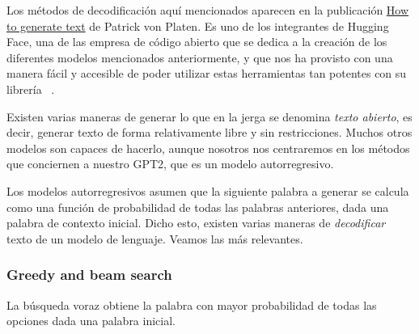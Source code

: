 Los métodos de decodificación aquí mencionados aparecen en la publicación \href{https://huggingface.co/blog/how-to-generate}{How to generate text} de Patrick von Platen. Es uno de los integrantes de Hugging Face, una de las empresa de código abierto que se dedica a la creación de los diferentes modelos mencionados anteriormente, y que nos ha provisto con una manera fácil y accesible de poder utilizar estas herramientas tan potentes con su librería ~\cite{WolfEtal2020Transformers}.

Existen varias maneras de generar lo que en la jerga se denomina \textit{texto abierto}, es decir, generar texto de forma relativamente libre y sin restricciones. Muchos otros modelos son capaces de hacerlo, aunque nosotros nos centraremos en los métodos que conciernen a nuestro GPT2, que es un modelo autorregresivo.

Los modelos autorregresivos asumen que la siguiente palabra a generar se calcula como una función de probabilidad de todas las palabras anteriores, dada una palabra de contexto inicial. Dicho esto, existen varias maneras de \textit{decodificar} texto de un modelo de lenguaje. Veamos las más relevantes.

\subsubsection{Greedy and beam search}
La búsqueda voraz obtiene la palabra con mayor probabilidad de todas las opciones dada una palabra inicial. 


